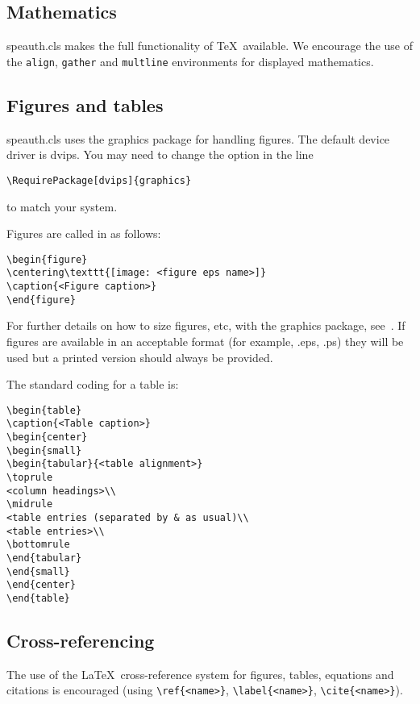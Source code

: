 \documentclass{speauth}
\begin{document}
\subsection{Mathematics}
\textsf{speauth.cls} makes the full functionality of \AmS\/\TeX\ available.
We encourage the use of the \verb"align", \verb"gather" and \verb"multline"
environments for displayed mathematics.

\subsection{Figures and tables}
\textsf{speauth.cls} uses the \textsf{graphics} package for handling figures.
The default device driver is \textsf{dvips}.
You may need to change the option in the line
\begin{verbatim}
\RequirePackage[dvips]{graphics}
\end{verbatim}
to match your system.

Figures are called in as follows:
\begin{verbatim}
\begin{figure}
\centering\texttt{[image: <figure eps name>]}
\caption{<Figure caption>}
\end{figure}
\end{verbatim}

For further details on how to size figures, etc,
with the \textsf{graphics} package, see~\cite{Companion,KopkaDaly}.
If figures are available in an acceptable format (for example, .eps, .ps)
they will be used but a printed version should always be provided.
\mb

The standard coding for a table is:
\begin{verbatim}
\begin{table}
\caption{<Table caption>}
\begin{center}
\begin{small}
\begin{tabular}{<table alignment>}
\toprule
<column headings>\\
\midrule
<table entries (separated by & as usual)\\
<table entries>\\
\bottomrule
\end{tabular}
\end{small}
\end{center}
\end{table}
\end{verbatim}

\subsection{Cross-referencing}
The use of the \LaTeX\ cross-reference system
for figures, tables, equations and citations is encouraged
(using \verb"\ref{<name>}", \verb"\label{<name>}", \verb"\cite{<name>}").
\end{document}
